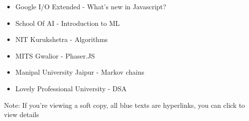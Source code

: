 \begin{itemize}
    \item Google I/O Extended - What's new in Javascript?
    \item School Of AI - Introduction to ML
    \item NIT Kurukshetra - Algorithms
    \item MITS Gwalior - Phaser.JS
    \item Manipal University Jaipur - Markov chains
    \item Lovely Professional University - DSA 
\end{itemize}


\item Note: If you’re viewing a soft copy, all blue texts
are hyperlinks, you can click to view details
